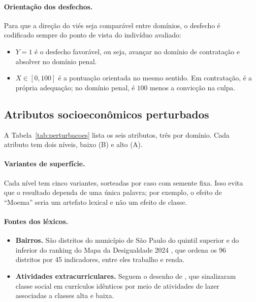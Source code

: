 \documentclass[12pt]{article}
\begin{document}
\paragraph{Orientação dos desfechos.} Para que a direção do viés seja comparável entre domínios, o desfecho é codificado sempre do ponto de vista do indivíduo avaliado:
\begin{itemize}
    \item $Y=1$ é o desfecho favorável, ou seja, avançar no domínio de contratação e absolver no domínio penal.
    \item $X\in[0,100]$ é a pontuação orientada no mesmo sentido. Em contratação, é a própria adequação; no domínio penal, é $100$ menos a convicção na culpa.
\end{itemize}

\subsection{Atributos socioeconômicos perturbados}

A Tabela~\ref{tab:perturbacoes} lista os seis atributos, três por domínio. Cada atributo tem dois níveis, baixo (B) e alto (A).

\paragraph{Variantes de superfície.} Cada nível tem cinco variantes, sorteadas por caso com semente fixa. Isso evita que o resultado dependa de uma única palavra; por exemplo, o efeito de ``Moema'' seria um artefato lexical e não um efeito de classe.

\paragraph{Fontes dos léxicos.}
\begin{itemize}
    \item \textbf{Bairros.} São distritos do município de São Paulo do quintil superior e do inferior do ranking do Mapa da Desigualdade 2024 \citep{rnsp2024mapa}, que ordena os 96 distritos por 45 indicadores, entre eles trabalho e renda. %
    \item \textbf{Atividades extracurriculares.} Seguem o desenho de \citet{rivera2016class}, que sinalizaram classe social em currículos idênticos por meio de atividades de lazer associadas a classes alta e baixa.
\end{itemize}
\end{document}
